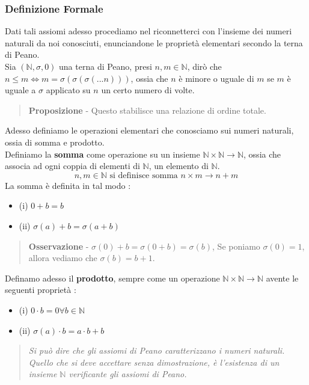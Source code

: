 \documentclass[12pt, letterpaper]{article}
\begin{document}
\subsubsection{Definizione Formale}
Dati tali assiomi adesso procediamo nel riconnetterci con l'insieme dei numeri naturali da noi conosciuti,
enunciandone le proprietà elementari secondo la terna di Peano.\\
Sia \((\mathbb{N} ,\sigma ,0)\) una terna di Peano, presi \(n,m \in \mathbb{N}\), dirò che \(n\le m \iff m = \sigma(\sigma(\sigma(...n)))\),
ossia che \(n\) è minore o uguale di \(m\) se \(m\) è uguale a \(\sigma\) applicato su \(n\) un certo numero di volte. 
\begin{quote}
    \textbf{Proposizione} - Questo stabilisce una relazione di ordine totale.
\end{quote}
Adesso definiamo le operazioni elementari che conosciamo sui numeri naturali, ossia di somma e prodotto.\\
Definiamo la \textbf{somma} come operazione su un insieme \(\mathbb{N} \times \mathbb{N} \rightarrow\mathbb{N}\), ossia che 
associa ad ogni coppia di elementi di \(\mathbb{N}\), un elemento di \(\mathbb{N}\).
\begin{equation}
    n,m\in \mathbb{N}\text{ si definisce somma } n\times m \rightarrow n+m
\end{equation}
La somma è definita in tal modo :
\begin{itemize}
    \item (i) \(0+b=b\)
    \item (ii) \(\sigma(a)+b=\sigma(a+b)\)
\end{itemize}
\begin{quote}
    \textbf{Osservazione} - \(\sigma(0)+b = \sigma(0+b)=\sigma(b)\),
    Se poniamo \(\sigma(0)=1\), allora vediamo che \(\sigma(b)=b+1\).
\end{quote}
Definamo adesso il \textbf{prodotto}, sempre come un operazione \(\mathbb{N} \times \mathbb{N} \rightarrow\mathbb{N}\)
avente le seguenti proprietà :
\begin{itemize}
    \item (i) \(0\cdot b=0 \forall b\in \mathbb{N}\)
    \item (ii) \(\sigma(a)\cdot b = a\cdot b +b\)
\end{itemize}
\begin{quote}
    \textit{Si può dire che gli assiomi di Peano caratterizzano i numeri naturali. Quello che si deve 
    accettare senza dimostrazione, è l'esistenza di un insieme \(\mathbb{N}\) verificante gli
    assiomi di Peano.}
\end{quote}
\end{document}
